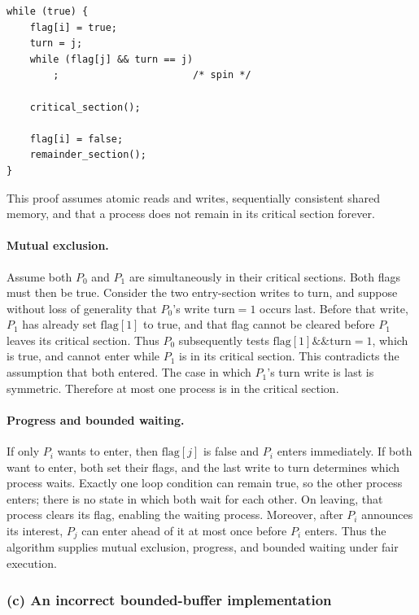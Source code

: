 \begin{verbatim}
while (true) {
    flag[i] = true;
    turn = j;
    while (flag[j] && turn == j)
        ;                       /* spin */

    critical_section();

    flag[i] = false;
    remainder_section();
}
\end{verbatim}

This proof assumes atomic reads and writes, sequentially consistent
shared memory, and that a process does not remain in its critical
section forever.

\paragraph{Mutual exclusion.}
Assume both \(P_0\) and \(P_1\) are simultaneously in their critical
sections.  Both flags must then be true.  Consider the two entry-section
writes to \(\mathrm{turn}\), and suppose without loss of generality that
\(P_0\)'s write \(\mathrm{turn}=1\) occurs last.  Before that write,
\(P_1\) has already set \(\mathrm{flag}[1]\) to true, and that flag
cannot be cleared before \(P_1\) leaves its critical section.  Thus
\(P_0\) subsequently tests
\(\mathrm{flag}[1]\mathbin{\&\&}\mathrm{turn}=1\), which is true, and
cannot enter while \(P_1\) is in its critical section.  This
contradicts the assumption that both entered.  The case in which
\(P_1\)'s turn write is last is symmetric.  Therefore at most one
process is in the critical section.

\paragraph{Progress and bounded waiting.}
If only \(P_i\) wants to enter, then \(\mathrm{flag}[j]\) is false and
\(P_i\) enters immediately.  If both want to enter, both set their
flags, and the last write to \(\mathrm{turn}\) determines which process
waits.  Exactly one loop condition can remain true, so the other
process enters; there is no state in which both wait for each other.
On leaving, that process clears its flag, enabling the waiting process.
Moreover, after \(P_i\) announces its interest, \(P_j\) can enter ahead
of it at most once before \(P_i\) enters.  Thus the algorithm supplies
mutual exclusion, progress, and bounded waiting under fair execution.

\subsubsection*{(c) An incorrect bounded-buffer implementation}

